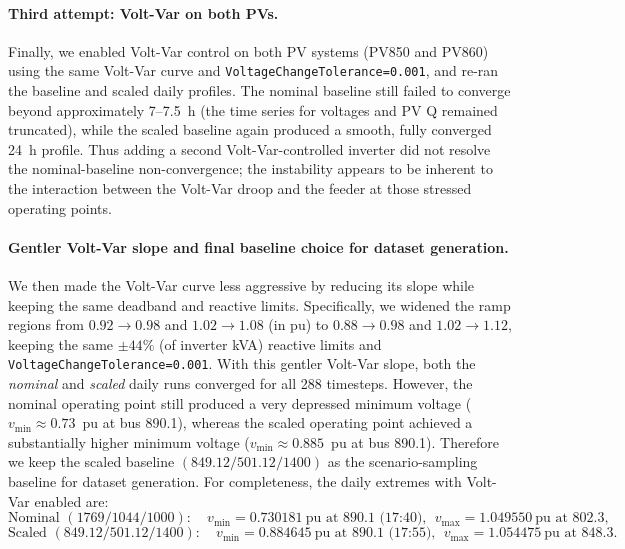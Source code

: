 \documentclass[11pt]{article}
\begin{document}
\paragraph{Third attempt: Volt-Var on both PVs.}
Finally, we enabled Volt-Var control on both PV systems (PV850 and PV860) using the same Volt-Var curve and \texttt{VoltageChangeTolerance=0.001}, and re-ran the baseline and scaled daily profiles. The nominal baseline still failed to converge beyond approximately 7--7.5~h (the time series for voltages and PV Q remained truncated), while the scaled baseline again produced a smooth, fully converged 24~h profile. Thus adding a second Volt-Var-controlled inverter did not resolve the nominal-baseline non-convergence; the instability appears to be inherent to the interaction between the Volt-Var droop and the feeder at those stressed operating points.

\paragraph{Gentler Volt-Var slope and final baseline choice for dataset generation.}
We then made the Volt-Var curve less aggressive by reducing its slope while keeping the same deadband and reactive limits. Specifically, we widened the ramp regions from $0.92 \to 0.98$ and $1.02 \to 1.08$ (in pu) to $0.88 \to 0.98$ and $1.02 \to 1.12$, keeping the same $\pm 44\%$ (of inverter kVA) reactive limits and \texttt{VoltageChangeTolerance=0.001}. With this gentler Volt-Var slope, both the \emph{nominal} and \emph{scaled} daily runs converged for all 288 timesteps. However, the nominal operating point still produced a very depressed minimum voltage ($v_{\min}\approx 0.73$~pu at bus 890.1), whereas the scaled operating point achieved a substantially higher minimum voltage ($v_{\min}\approx 0.885$~pu at bus 890.1). Therefore we keep the scaled baseline $(849.12/501.12/1400)$ as the scenario-sampling baseline for dataset generation.
For completeness, the daily extremes with Volt-Var enabled are:
\[
\text{Nominal }(1769/1044/1000):\quad v_{\min}=0.730181~\text{pu at }890.1\text{ (17:40)},\ \ v_{\max}=1.049550~\text{pu at }802.3,
\]
\[
\text{Scaled }(849.12/501.12/1400):\quad v_{\min}=0.884645~\text{pu at }890.1\text{ (17:55)},\ \ v_{\max}=1.054475~\text{pu at }848.3.
\]
\end{document}
